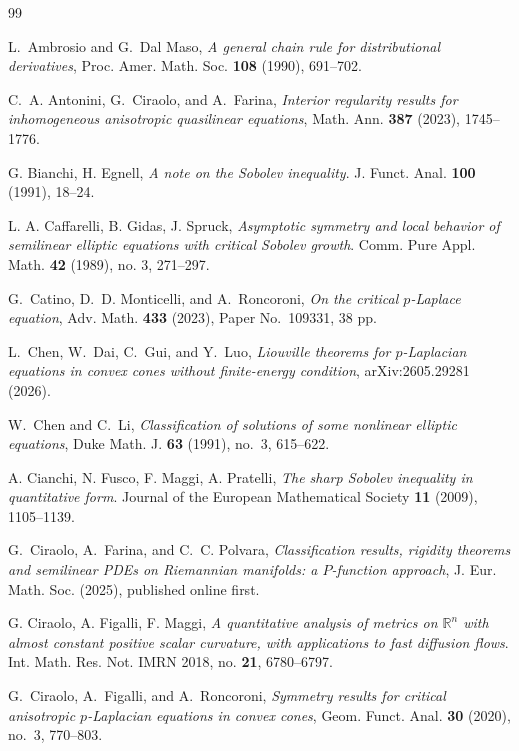 \documentclass[reqno,12pt]{amsart}
\numberwithin{equation}{section}
\theoremstyle{remark}
\begin{document}
\begin{thebibliography}{99}

L.~Ambrosio and G.~Dal Maso,
\emph{A general chain rule for distributional derivatives},
Proc. Amer. Math. Soc. \textbf{108} (1990), 691--702.

C.~A. Antonini, G.~Ciraolo, and A.~Farina,
\emph{Interior regularity results for inhomogeneous anisotropic quasilinear equations},
Math. Ann. \textbf{387} (2023), 1745--1776.

G. Bianchi, H. Egnell, \emph{A note on the Sobolev inequality}. J. Funct. Anal.
\textbf{100} (1991), 18--24.

L. A. Caffarelli, B. Gidas, J. Spruck, 
\emph{Asymptotic symmetry and local behavior of semilinear elliptic equations with critical Sobolev growth}.
Comm. Pure Appl. Math. \textbf{42} (1989), no. 3, 271--297.

G.~Catino, D.~D. Monticelli, and A.~Roncoroni,
\emph{On the critical $p$-Laplace equation},
Adv. Math. \textbf{433} (2023), Paper No.~109331, 38 pp.

L.~Chen, W.~Dai, C.~Gui, and Y.~Luo,
\emph{Liouville theorems for $p$-Laplacian equations in convex cones without finite-energy condition},
arXiv:2605.29281 (2026).

W.~Chen and C.~Li,
\emph{Classification of solutions of some nonlinear elliptic equations},
Duke Math. J. \textbf{63} (1991), no.~3, 615--622.

A. Cianchi, N. Fusco, F. Maggi, A. Pratelli, \emph{The sharp Sobolev inequality in quantitative form}. Journal of the European Mathematical Society
\textbf{11} (2009), 1105--1139. 

G.~Ciraolo, A.~Farina, and C.~C. Polvara,
\emph{Classification results, rigidity theorems and semilinear PDEs on
Riemannian manifolds: a $P$-function approach},
J. Eur. Math. Soc. (2025), published online first.

G. Ciraolo, A. Figalli, F. Maggi, \emph{A quantitative analysis of metrics on $\mathbb R^n$ with almost constant positive scalar curvature, with applications to fast diffusion flows}. Int. Math. Res. Not. IMRN 2018, no. \textbf{21}, 6780–6797.

G.~Ciraolo, A.~Figalli, and A.~Roncoroni,
\emph{Symmetry results for critical anisotropic $p$-Laplacian equations in convex cones},
Geom. Funct. Anal. \textbf{30} (2020), no.~3, 770--803.



\end{thebibliography}
\end{document}
